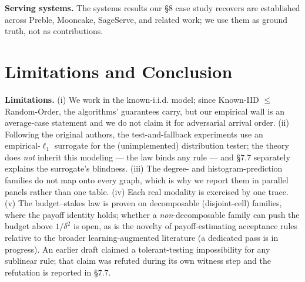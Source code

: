 \textbf{Serving systems.} The systems results our §8 case study recovers
are established across Preble, Mooncake, SageServe, and related work; we
use them as ground truth, not as contributions.

\section{Limitations and Conclusion}

\textbf{Limitations.} (i) We work in the known-i.i.d. model; since
Known-IID \(\le\) Random-Order, the algorithms' guarantees carry, but
our empirical wall is an average-case statement and we do not claim it
for adversarial arrival order. (ii) Following the original authors, the
test-and-fallback experiments use an empirical-\(\ell_1\) surrogate for
the (unimplemented) distribution tester; the theory does \emph{not}
inherit this modeling --- the law binds any rule --- and §7.7 separately
explains the surrogate's blindness. (iii) The degree- and
histogram-prediction families do not map onto every graph, which is why
we report them in parallel panels rather than one table. (iv) Each real
modality is exercised by one trace. (v) The budget--stakes law is proven
on decomposable (disjoint-cell) families, where the payoff identity
holds; whether a \emph{non}-decomposable family can push the budget
above \(1/\delta^2\) is open, as is the novelty of payoff-estimating
acceptance rules relative to the broader learning-augmented literature
(a dedicated pass is in progress). An earlier draft claimed a
tolerant-testing impossibility for any sublinear rule; that claim was
refuted during its own witness step and the refutation is reported in
§7.7.

